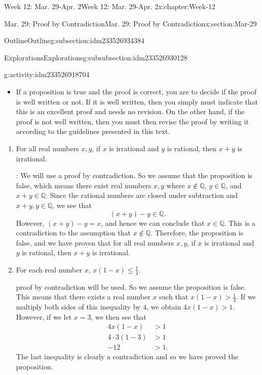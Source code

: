 \documentclass[oneside,10pt,]{book}
\numberwithin{equation}{section}
\renewcommand{\le}{\leqslant}
\def\Q{{\mathbb Q}}
\newcommand{\Q}{\mathbb Q}
\newcommand{\gt}{>}
\newcommand{\amp}{&}
\begin{document}
\begin{chapterptx}{Week 12: Mar. 29-Apr. 2}{}{Week 12: Mar. 29-Apr. 2}{}{}{x:chapter:Week-12}
\begin{sectionptx}{Mar. 29: Proof by Contradiction}{}{Mar. 29: Proof by Contradiction}{}{}{x:section:Mar-29}
\begin{subsectionptx}{Outline}{}{Outline}{}{}{g:subsection:idm233526934384}
\begin{subsubsectionptx}{Explorations}{}{Explorations}{}{}{g:subsubsection:idm233526930128}
\begin{activity}{}{g:activity:idm233526918704}
\begin{itemize}[label=\textbullet]
\item{}If a proposition is true and the proof is correct, you are to decide if the proof is well written or not. If it is well written, then you simply must indicate that this is an excellent proof and needs no revision. On the other hand, if the proof is not well written, then you must then revise the proof by writing it according to the guidelines presented in this text.%
\end{itemize}
%
%
\begin{enumerate}
\item{}For all real numbers \(x,y\), if \(x\) is irrational and \(y\) is rational, then \(x+y\) is irrational.%
\par\smallskip%
\noindentProof: We will use a proof by contradiction. So we assume that the proposition is false, which means there exist real numbers \(x,y\) where \(x\notin \Q\), \(y\in \Q\), and \(x+y\in \Q\). Since the rational numbers are closed under subtraction and \(x+y,y\in\Q\), we see that%
\begin{equation*}
(x+y)-y\in\Q.
\end{equation*}
However, \((x+y)-y = x\), and hence we can conclude that \(x\in\Q\). This is a contradiction to the assumption that \(x\notin \Q\). Therefore, the proposition is false, and we have proven that for all real numbers \(x,y\), if \(x\) is irrational and \(y\) is rational, then \(x+y\) is irrational.%
\item{}For each real number \(x\), \(x(1-x) \le \frac{1}{4}\).%
\par\smallskip%
\noindentA proof by contradiction will be used. So we assume the proposition is false. This means that there exists a real number \(x\) such that \(x(1-x) \gt \frac{1}{4}\). If we multiply both sides of this inequality by \(4\), we obtain \(4x(1-x) > 1\). However, if we let \(x=3\), we then see that%
\begin{align*}
4x (1-x) \amp \gt 1\\
4\cdot 3(1-3) \amp\gt 1 \\
-12 \amp \gt 1. 
\end{align*}
The last inequality is clearly a contradiction and so we have proved the proposition.%
\end{enumerate}
\end{activity}%
\end{subsubsectionptx}
\end{subsectionptx}
%
%
\typeout{************************************************}

\end{sectionptx}
\end{chapterptx}
\end{document}
